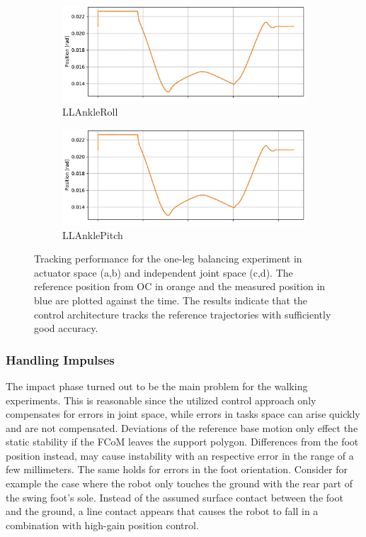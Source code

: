 \begin{figure}[h!]
\begin{subfigure}{.5\textwidth}
	\includegraphics[page=3, width=.95\linewidth]{experiments/balancing/ankleTrack}
	\caption{LLAnkleRoll}	
	\end{subfigure}%
\begin{subfigure}{.5\textwidth}
	\includegraphics[page=4, width=.95\linewidth]{experiments/balancing/ankleTrack}
	\caption{LLAnklePitch}	
\end{subfigure}%
\caption[Tracking performance for the one-leg balancing experiment]{Tracking performance for the one-leg balancing experiment in actuator space (a,b) and independent joint space (c,d). The reference position from \gls{OC} in orange and the measured position in blue are plotted against the time. The results indicate that the control architecture tracks the reference trajectories with sufficiently good accuracy.}
\label{exp:BalancingTracking}
\end{figure} 
\subsubsection{Handling Impulses}
The impact phase turned out to be the main problem for the walking experiments. This is reasonable since the utilized control approach only compensates for errors in joint space, while errors in tasks space can arise quickly and are not compensated. Deviations of the reference base motion only effect the static stability if the \gls{FCoM} leaves the support polygon. Differences from the foot position instead, may cause instability with an respective error in the range of a few millimeters. The same holds for errors in the foot orientation. Consider for example the case where the robot only touches the ground with the rear part of the swing foot's sole. Instead of the assumed surface contact between the foot and the ground, a line contact appears that causes the robot to fall in a combination with high-gain position control. 
